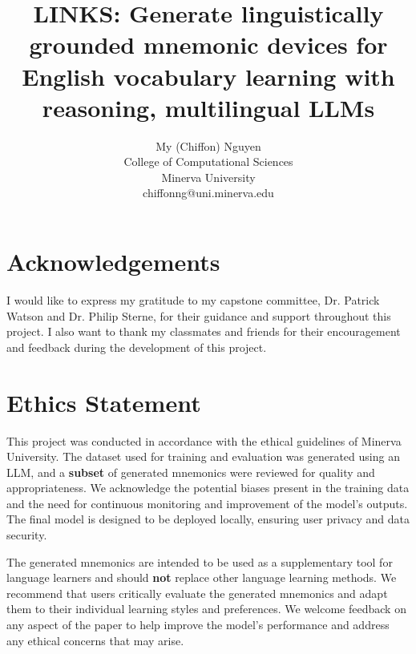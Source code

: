 \documentclass[11pt]{article}
\title{\textbf{LINKS}: Generate linguistically grounded mnemonic devices for English vocabulary learning with reasoning, multilingual LLMs
}
\author{%
  My (Chiffon) Nguyen \\
  College of Computational Sciences \\
  Minerva University \\
  chiffonng@uni.minerva.edu
}
\begin{document}


\maketitle








\section*{Acknowledgements}
I would like to express my gratitude to my capstone committee, Dr. Patrick Watson and Dr. Philip Sterne, for their guidance and support throughout this project. I also want to thank my classmates and friends for their encouragement and feedback during the development of this project.

\section*{Ethics Statement}
This project was conducted in accordance with the ethical guidelines of Minerva University. The dataset used for training and evaluation was generated using an LLM, and a \textbf{subset} of generated mnemonics were reviewed for quality and appropriateness. We acknowledge the potential biases present in the training data and the need for continuous monitoring and improvement of the model's outputs. The final model is designed to be deployed locally, ensuring user privacy and data security.

The generated mnemonics are intended to be used as a supplementary tool for language learners and should \textbf{not} replace other language learning methods. We recommend that users critically evaluate the generated mnemonics and adapt them to their individual learning styles and preferences. We welcome feedback on any aspect of the paper to help improve the model's performance and address any ethical concerns that may arise.




\end{document}
